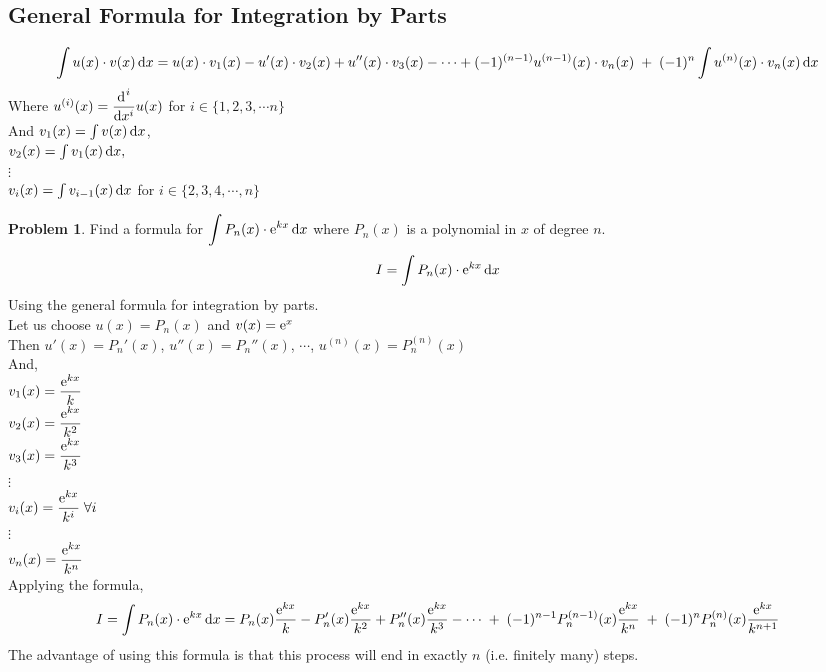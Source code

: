 \documentclass[14]{article}
\theoremstyle{definition}
\newtheorem{prob}{Problem}
\theoremstyle{case}
\begin{document}
\subsection{General Formula for Integration by Parts}
\[\int u(x) \cdot v(x) \dif x = u(x)\cdot v_1(x) - u'(x)\cdot v_2(x) + u''(x)\cdot v_3(x) - \cdots + (-1)^{(n-1)} u^{(n-1)}(x)\cdot v_n(x)\; +\; (-1)^n \int u^{(n)}(x) \cdot v_n(x) \dif x \]
Where $u^{(i)}(x) = \dfrac{\dif^{\;i}}{\dif x^i} u(x)$  for $i \in \{1, 2, 3, \cdots n\}$\\
And $v_1(x) = \int v(x) \dif x$,\\ $v_2(x) = \int v_1(x) \dif x,$\\ $\vdots$\\ $v_i(x) = \int v_{i-1}(x) \dif x$ for $i \in \{2, 3, 4, \cdots, n\}$
\begin{prob}
Find a formula for $\displaystyle\int P_n(x)\cdot {\rm e}^{kx} \dif x$ where $P_n(x)$ is a polynomial in $x$ of degree $n$.
\[I = \int P_n(x)\cdot {\rm e}^{kx} \dif x\]
Using the general formula for integration by parts.\\
Let us choose $u(x) = P_n(x)$ and $v(x) = {\rm e}^x $\\
Then $u'(x) = P_n'(x)$, $u''(x) = P_n''(x)$, $\cdots$, $u^{(n)}(x) = P_n^{(n)}(x)$\\
And,\\ 
$v_1(x) = \dfrac{{\rm e}^{kx}}{k}$\\
$v_2(x) = \dfrac{{\rm e}^{kx}}{k^2}$\\
$v_3(x) = \dfrac{{\rm e}^{kx}}{k^3}$\\
$\vdots$\\
$v_i(x) = \dfrac{{\rm e}^{kx}}{k^i} \; \forall i$\\
$\vdots$\\
$v_n(x) = \dfrac{{\rm e}^{kx}}{k^n}$\\
Applying the formula,
\[I = \int P_n(x)\cdot {\rm e}^{kx} \dif x
= P_n(x) \dfrac{{\rm e}^{kx}}{k} - P_n'(x)\dfrac{{\rm e}^{kx}}{k^2}+P_n''(x)\dfrac{{\rm e}^{kx}}{k^3}-\cdots\;+\;(-1)^{n-1} P_n^{(n-1)}(x)\dfrac{{\rm e}^{kx}}{k^n} \;+\; (-1)^n P_n^{(n)}(x)\dfrac{{\rm e}^{kx}}{k^{n+1}}
\]
The advantage of using this formula is that this process will end in exactly $n$ (i.e. finitely many) steps.
\end{prob}
\pagebreak
\end{document}
